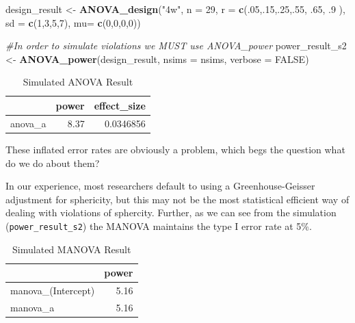 \documentclass[]{book}
\newenvironment{Shaded}{\begin{snugshade}}{\end{snugshade}}
\newcommand{\CommentTok}[1]{\textcolor[rgb]{0.56,0.35,0.01}{\textit{#1}}}
\newcommand{\DataTypeTok}[1]{\textcolor[rgb]{0.13,0.29,0.53}{#1}}
\newcommand{\DecValTok}[1]{\textcolor[rgb]{0.00,0.00,0.81}{#1}}
\newcommand{\FloatTok}[1]{\textcolor[rgb]{0.00,0.00,0.81}{#1}}
\newcommand{\KeywordTok}[1]{\textcolor[rgb]{0.13,0.29,0.53}{\textbf{#1}}}
\newcommand{\NormalTok}[1]{#1}
\newcommand{\OtherTok}[1]{\textcolor[rgb]{0.56,0.35,0.01}{#1}}
\newcommand{\StringTok}[1]{\textcolor[rgb]{0.31,0.60,0.02}{#1}}
\begin{document}
\begin{Shaded}
\begin{Highlighting}[]
\NormalTok{design_result <-}\StringTok{ }\KeywordTok{ANOVA_design}\NormalTok{(}\StringTok{"4w"}\NormalTok{,}
                              \DataTypeTok{n =} \DecValTok{29}\NormalTok{,}
                              \DataTypeTok{r =} \KeywordTok{c}\NormalTok{(.}\DecValTok{05}\NormalTok{,.}\DecValTok{15}\NormalTok{,.}\DecValTok{25}\NormalTok{,.}\DecValTok{55}\NormalTok{, }\FloatTok{.65}\NormalTok{, }\FloatTok{.9}
\NormalTok{                                    ),}
                              \DataTypeTok{sd =} \KeywordTok{c}\NormalTok{(}\DecValTok{1}\NormalTok{,}\DecValTok{3}\NormalTok{,}\DecValTok{5}\NormalTok{,}\DecValTok{7}\NormalTok{),}
                              \DataTypeTok{mu=} \KeywordTok{c}\NormalTok{(}\DecValTok{0}\NormalTok{,}\DecValTok{0}\NormalTok{,}\DecValTok{0}\NormalTok{,}\DecValTok{0}\NormalTok{))}

\CommentTok{#In order to simulate violations we MUST use ANOVA_power}
\NormalTok{power_result_s2 <-}\StringTok{ }\KeywordTok{ANOVA_power}\NormalTok{(design_result, }\DataTypeTok{nsims =}\NormalTok{ nsims, }\DataTypeTok{verbose =} \OtherTok{FALSE}\NormalTok{)}
\end{Highlighting}
\end{Shaded}

\begin{table}[!h]

\caption{\label{tab:unnamed-chunk-177}Simulated ANOVA Result}
\centering
\begin{tabular}{l|r|r}
\hline
  & power & effect\_size\\
\hline
anova\_a & 8.37 & 0.0346856\\
\hline
\end{tabular}
\end{table}

These inflated error rates are obviously a problem, which begs the question what do we do about them?

In our experience, most researchers default to using a Greenhouse-Geisser adjustment for sphericity, but this may not be the most statistical efficient way of dealing with violations of sphercity. Further, as we can see from the simulation (\texttt{power\_result\_s2}) the MANOVA maintains the type I error rate at 5\%.

\begin{table}[!h]

\caption{\label{tab:unnamed-chunk-178}Simulated MANOVA Result}
\centering
\begin{tabular}{l|r}
\hline
  & power\\
\hline
manova\_(Intercept) & 5.16\\
\hline
manova\_a & 5.16\\
\hline
\end{tabular}
\end{table}
\end{document}
